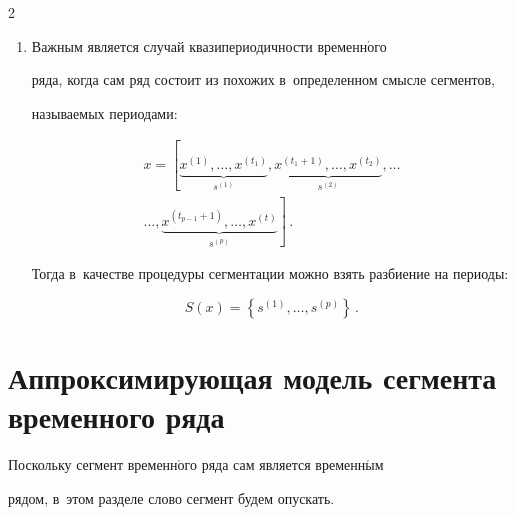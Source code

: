 \begin{multicols}{2}
\begin{enumerate}[1.]
\item


  Важным является случай квазипериодичности временн$\acute{\mbox{о}}$го 


  ряда, когда сам ряд состоит из похожих в~определенном смысле сегментов, 


  называемых периодами:


  \begin{multline*}




  x=\left[\underbrace{x^{(1)},\dots,x^{(t_1)}}_{s^{(1)}},\underbrace{x^{(t_1+1)},


\dots,x^{(t_2)}}_{s^{(2)}},\dots\right.\\


\left.\dots,\underbrace{x^{(t_{p-1}+1)},\dots,x^{(t)}}_{s^{(p)}}


  \right]\,.


  \end{multline*}


  Тогда в~качестве процедуры сегментации можно взять разбиение на периоды:


  \begin{equation*}




  S(x)= \left\{s^{(1)},\dots,s^{(p)}\right\}\,.


  \end{equation*}


\end{enumerate}








\section{Аппроксимирующая модель сегмента временного ряда}







Поскольку сегмент временн$\acute{\mbox{о}}$го ряда сам является временн$\acute{\mbox{ы}}$м 


рядом, в~этом разделе слово сегмент будем опускать.





\smallskip






\end{multicols}
